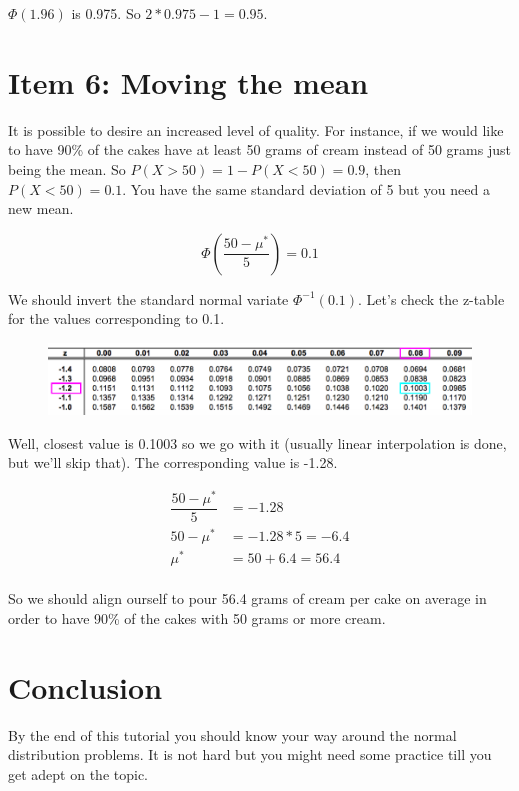 \documentclass[]{book}
\theoremstyle{definition}
\theoremstyle{definition}
\theoremstyle{definition}
\theoremstyle{remark}
\begin{document}
\(\Phi(1.96)\) is 0.975. So \(2*0.975 - 1 = 0.95\).

\hypertarget{item-6-moving-the-mean}{%
\section{Item 6: Moving the mean}\label{item-6-moving-the-mean}}

It is possible to desire an increased level of quality. For instance, if
we would like to have 90\% of the cakes have at least 50 grams of cream
instead of 50 grams just being the mean. So
\(P(X > 50) = 1 - P(X < 50) = 0.9\), then \(P(X < 50) = 0.1\). You have
the same standard deviation of 5 but you need a new mean.

\[\Phi \left(\dfrac{50 - \mu^*}{5}\right) = 0.1\]

We should invert the standard normal variate \(\Phi^{-1}(0.1)\). Let's
check the z-table for the values corresponding to 0.1.

\begin{figure}
\begin{center}
\includegraphics[width=0.95\columnwidth]{img/ss4}
\end{center}
\end{figure}

Well, closest value is 0.1003 so we go with it (usually linear
interpolation is done, but we'll skip that). The corresponding value is
-1.28.

\begin{align*}
\dfrac{50 - \mu^*}{5} &= -1.28 \\
50 - \mu^* &= -1.28*5 = -6.4 \\
\mu^* &= 50 + 6.4 = 56.4 \\
\end{align*}

So we should align ourself to pour 56.4 grams of cream per cake on
average in order to have 90\% of the cakes with 50 grams or more cream.

\hypertarget{conclusion}{%
\section{Conclusion}\label{conclusion}}

By the end of this tutorial you should know your way around the normal
distribution problems. It is not hard but you might need some practice
till you get adept on the topic.


\end{document}
